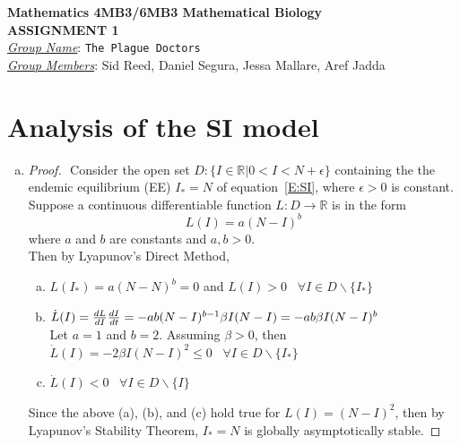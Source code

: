 \documentclass[12pt]{article}
\begin{document}
\begin{center}
{\bfseries Mathematics 4MB3/6MB3 Mathematical Biology\\
 ASSIGNMENT {\color{blue}1}}\\
\medskip
\underline{\emph{Group Name}}: \texttt{{\color{blue}The Plague Doctors}}\\
\medskip
\underline{\emph{Group Members}}: {\color{blue}Sid Reed, Daniel Segura, Jessa Mallare, Aref Jadda}
\end{center}
\section{Analysis of the SI model}

\SIanalIntro
\begin{enumerate}[(a)]
\item \SIanalQa

  {\color{blue}
    \begin{proof}
      $ $\newline
      Consider the open set $D: \{I\in \mathds{R}| 0 < I < N+\epsilon \}$ containing the the endemic equilibrium (EE) $I_* = N$ of        equation~\eqref{E:SI}, where $\epsilon > 0$ is constant.
      Suppose a continuous differentiable function $L:D\rightarrow \mathds{R}$  is in the form
      \begin{equation}
      L(I) = a(N-I)^b
      \end{equation} where $a$ and $b$ are constants and $a, b > 0$.\\

      Then by Lyapunov's Direct Method,
      \begin{enumerate}[(a)]
      	\item $L(I_*) = a(N-N)^b = 0$ and $L(I)>0$ \, $\forall I\in D\backslash \{I_*\}$
      	\item $\dot{L}(I)=\frac{dL}{dI}\frac{dI}{dt} \\
      	=-ab(N-I)^{b-1}\beta I(N-I)\\
      	=-ab\beta I(N-I)^b$\\
      	Let $a = 1$ and $b = 2$. Assuming $\beta>0$, then\\
      	$\dot{L}(I) = -2\beta I(N-I)^2 \leq 0$ \, $\forall I\in D\backslash \{I_*\}$
      	\item $\dot{L}(I) < 0$ \, $\forall I\in D\backslash \{I\}$
      \end{enumerate}
  	  Since the above (a), (b), and (c) hold true for $L(I) = (N-I)^2$, then by Lyapunov's Stability Theorem, $I_* = N$ is globally asymptotically stable.
    \end{proof}
  }


\end{enumerate}
\end{document}
